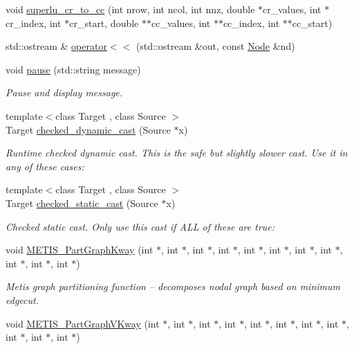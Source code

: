 \begin{DoxyCompactItemize}
void \hyperlink{namespaceoomph_ac806709e87d971d63a6a4ba4c9e0e40d}{superlu\+\_\+cr\+\_\+to\+\_\+cc} (int nrow, int ncol, int nnz, double $\ast$cr\+\_\+values, int $\ast$cr\+\_\+index, int $\ast$cr\+\_\+start, double $\ast$$\ast$cc\+\_\+values, int $\ast$$\ast$cc\+\_\+index, int $\ast$$\ast$cc\+\_\+start)
\item 
std\+::ostream \& \hyperlink{namespaceoomph_a55dc637c1a3983a8a46415846cc821d7}{operator$<$$<$} (std\+::ostream \&out, const \hyperlink{classoomph_1_1Node}{Node} \&nd)
\item 
void \hyperlink{namespaceoomph_a4a82243b0ce4c28469a290fe2d7cd2c4}{pause} (std\+::string message)
\begin{DoxyCompactList}\small\item\em Pause and display message. \end{DoxyCompactList}\item 
{\footnotesize template$<$class Target , class Source $>$ }\\Target \hyperlink{namespaceoomph_aa8b481c4e1fa0aa6b2cfe9e8188f675f}{checked\+\_\+dynamic\+\_\+cast} (Source $\ast$x)
\begin{DoxyCompactList}\small\item\em Runtime checked dynamic cast. This is the safe but slightly slower cast. Use it in any of these cases\+: \end{DoxyCompactList}\item 
{\footnotesize template$<$class Target , class Source $>$ }\\Target \hyperlink{namespaceoomph_a2dfa740f37368b226f0c0ced9cafe284}{checked\+\_\+static\+\_\+cast} (Source $\ast$x)
\begin{DoxyCompactList}\small\item\em Checked static cast. Only use this cast if A\+LL of these are true\+: \end{DoxyCompactList}\item 
void \hyperlink{namespaceoomph_a86e73012a914a19df3d849e1c6f4b9a1}{M\+E\+T\+I\+S\+\_\+\+Part\+Graph\+Kway} (int $\ast$, int $\ast$, int $\ast$, int $\ast$, int $\ast$, int $\ast$, int $\ast$, int $\ast$, int $\ast$, int $\ast$, int $\ast$)
\begin{DoxyCompactList}\small\item\em Metis graph partitioning function -- decomposes nodal graph based on minimum edgecut. \end{DoxyCompactList}\item 
void \hyperlink{namespaceoomph_abf5fe3c38b4c12aad8fdfd89b05599bd}{M\+E\+T\+I\+S\+\_\+\+Part\+Graph\+V\+Kway} (int $\ast$, int $\ast$, int $\ast$, int $\ast$, int $\ast$, int $\ast$, int $\ast$, int $\ast$, int $\ast$, int $\ast$, int $\ast$)
$$
\end{DoxyCompactItemize}

